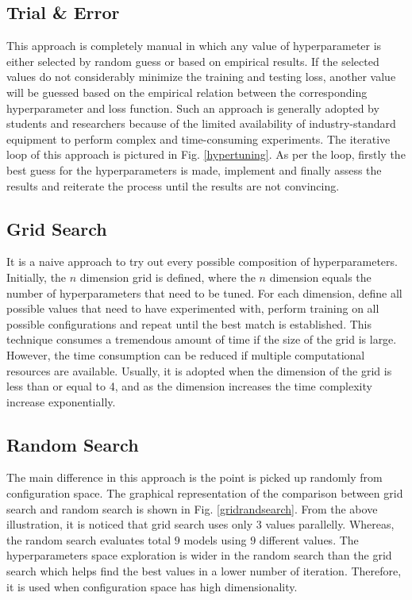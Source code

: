 \subsection{Trial \& Error}
This approach is completely manual in which any value of hyperparameter is either selected by random guess or based on empirical results. If the selected values do not considerably minimize the training and testing loss, another value will be guessed based on the empirical relation between the corresponding hyperparameter and loss function. Such an approach is generally adopted by students and researchers because of the limited availability of industry-standard equipment to perform complex and time-consuming experiments. The iterative loop of this approach is pictured in Fig. \ref{hypertuning}. As per the loop, firstly the best guess for the hyperparameters is made, implement and finally assess the results and reiterate the process until the results are not convincing.

\subsection{Grid Search}
It is a naive approach to try out every possible composition of hyperparameters. Initially, the $n$ dimension grid is defined, where the $n$ dimension equals the number of hyperparameters that need to be tuned. For each dimension, define all possible values that need to have experimented with, perform training on all possible configurations and repeat until the best match is established. This technique consumes a tremendous amount of time if the size of the grid is large. However, the time consumption can be reduced if multiple computational resources are available. Usually, it is adopted when the dimension of the grid is less than or equal to 4, and as the dimension increases the time complexity increase exponentially.

\subsection{Random Search}
The main difference in this approach is the point is picked up randomly from configuration space. The graphical representation of the comparison between grid search and random search is shown in Fig. \ref{gridrandsearch}. From the above illustration, it is noticed that grid search uses only $3$ values parallelly. Whereas, the random search evaluates total $9$ models using $9$ different values. The hyperparameters space exploration is wider in the random search than the grid search which helps find the best values in a lower number of iteration. Therefore, it is used when configuration space has high dimensionality.  


